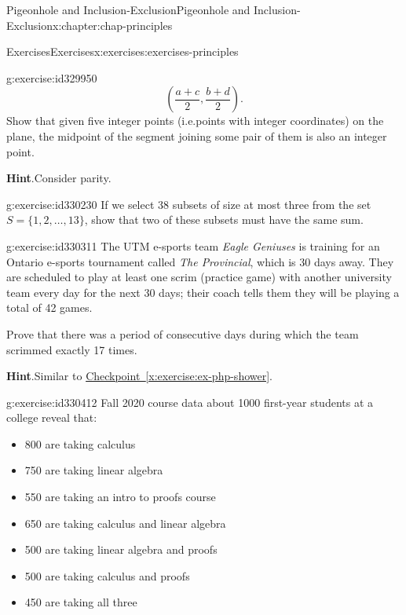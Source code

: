 \documentclass[oneside,10pt,]{book}
\newcommand{\blocktitlefont}{\relax}
\newcommand{\xreffont}{\relax}
\numberwithin{equation}{section}
\begin{document}
\begin{chapterptx}{Pigeonhole and Inclusion-Exclusion}{}{Pigeonhole and Inclusion-Exclusion}{}{}{x:chapter:chap-principles}
\begin{exercises-section}{Exercises}{}{Exercises}{}{}{x:exercises:exercises-principles}
\begin{divisionexercise}{6}{}{}{g:exercise:id329950}
\begin{equation*}
\left(\frac{a+c}{2},\frac{b+d}{2}\right)\text{.}
\end{equation*}
Show that given five integer points (i.e.\@ points with integer coordinates) on the plane, the midpoint of the segment joining some pair of them is also an integer point.%
\par\smallskip%
\noindent\textbf{\blocktitlefont Hint}.\hypertarget{g:hint:id330176}{}\quad{}Consider parity.%
\end{divisionexercise}%
\begin{divisionexercise}{7}{}{}{g:exercise:id330230}%
If we select 38 subsets of size at most three from the set \(S = \{1,2,\ldots,13\}\), show that two of these subsets must have the same sum.%
\end{divisionexercise}%
\begin{divisionexercise}{8}{}{}{g:exercise:id330311}%
The UTM e-sports team \emph{Eagle Geniuses} is training for an Ontario e-sports tournament called \emph{The Provincial}, which is 30 days away. They are scheduled to play at least one scrim (practice game) with another university team every day for the next 30 days; their coach tells them they will be playing a total of 42 games.%
\par
Prove that there was a period of consecutive days during which the team scrimmed exactly 17 times.%
\par\smallskip%
\noindent\textbf{\blocktitlefont Hint}.\hypertarget{g:hint:id330383}{}\quad{}Similar to \hyperref[x:exercise:ex-php-shower]{Checkpoint~{\xreffont\ref{x:exercise:ex-php-shower}}}.%
\end{divisionexercise}%
\begin{divisionexercise}{9}{}{}{g:exercise:id330412}%
Fall 2020 course data about 1000 first-year students at a college reveal that:%
\begin{itemize}[label=\textbullet]
\item{}800 are taking calculus%
\item{}750 are taking linear algebra%
\item{}550 are taking an intro to proofs course%
\item{}650 are taking calculus and linear algebra%
\item{}500 are taking linear algebra and proofs%
\item{}500 are taking calculus and proofs%
\item{}450 are taking all three%
\end{itemize}

\end{divisionexercise}
\end{exercises-section}
\end{chapterptx}
\end{document}
